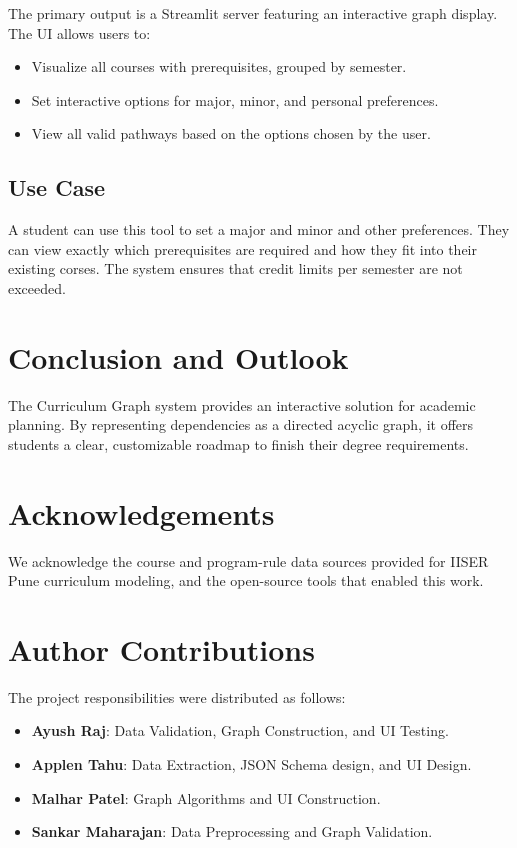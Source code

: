 The primary output is a Streamlit server featuring an interactive graph display. The UI allows users to:
\begin{itemize}
    \item Visualize all courses with prerequisites, grouped by semester.
    \item Set interactive options for major, minor, and personal preferences.
    \item View all valid pathways based on the options chosen by the user.
\end{itemize}

\subsection{Use Case}

A student can use this tool to set a major and minor and other preferences. 
They can view exactly which prerequisites are required and how they fit into their existing corses. 
The system ensures that credit limits per semester are not exceeded.

\section{Conclusion and Outlook}

The Curriculum Graph system provides an interactive solution for academic planning. 
By representing dependencies as a directed acyclic graph, 
it offers students a clear, customizable roadmap to finish their degree requirements.

\section{Acknowledgements}
We acknowledge the course and program-rule data sources provided for IISER Pune
curriculum modeling, and the open-source tools that enabled this work.

\section{Author Contributions}

The project responsibilities were distributed as follows:
\begin{itemize}
    \item \textbf{Ayush Raj}: Data Validation, Graph Construction, and UI Testing.
    \item \textbf{Applen Tahu}: Data Extraction, JSON Schema design, and UI Design.
    \item \textbf{Malhar Patel}: Graph Algorithms and UI Construction.
    \item \textbf{Sankar Maharajan}: Data Preprocessing and Graph Validation.
\end{itemize}

